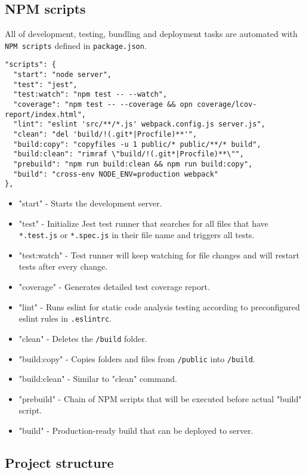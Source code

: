 \subsection{NPM scripts}
All of development, testing, bundling and deployment tasks are automated with \texttt{NPM scripts} defined in \texttt{package.json}.

\begin{lstlisting}
"scripts": {
  "start": "node server",
  "test": "jest",
  "test:watch": "npm test -- --watch",
  "coverage": "npm test -- --coverage && opn coverage/lcov-report/index.html",
  "lint": "eslint 'src/**/*.js' webpack.config.js server.js",
  "clean": "del 'build/!(.git*|Procfile)**'",
  "build:copy": "copyfiles -u 1 public/* public/**/* build",
  "build:clean": "rimraf \"build/!(.git*|Procfile)**\"",
  "prebuild": "npm run build:clean && npm run build:copy",
  "build": "cross-env NODE_ENV=production webpack"
},
\end{lstlisting}

\begin{itemize}
\item{"start" - Starts the development server.}
\item{"test" - Initialize Jest test runner that searches for all files that have \texttt{*.test.js} or \texttt{*.spec.js} in their file name and triggers all tests.}
\item{"test:watch" - Test runner will keep watching for file changes and will restart tests after every change.}
\item{"coverage" - Generates detailed test coverage report.}
\item{"lint" - Runs eslint for static code analysis testing according to preconfigured eslint rules in \texttt{.eslintrc}.}
\item{"clean" - Deletes the \texttt{/build} folder.}
\item{"build:copy" - Copies folders and files from \texttt{/public} into \texttt{/build}.}
\item{"build:clean" - Similar to "clean" command.}
\item{"prebuild" - Chain of NPM scripts that will be executed before actual "build" script.}
\item{"build" - Production-ready build that can be deployed to server.}
\end{itemize}

\subsection{Project structure}

